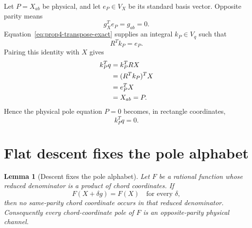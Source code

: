 \documentclass[11pt]{article}
\newtheorem{lemma}[theorem]{Lemma}
\theoremstyle{definition}
\begin{document}
Let \(P=X_{ab}\) be physical, and let \(e_P\in V_X\) be its standard basis vector.  Opposite parity means
\[
g_X^Te_P=g_{ab}=0.
\]
Equation~\eqref{eq:prop4-transpose-exact} supplies an integral \(k_P\in V_q\) such that
\begin{equation}
R^Tk_P=e_P.
\label{eq:kpreimage}
\end{equation}
Pairing this identity with \(X\) gives
\begin{align}
k_P^Tq
&=k_P^TRX\notag\\
&=(R^Tk_P)^TX\notag\\
&=e_P^TX\notag\\
&=X_{ab}=P.
\label{eq:pole-rectangle-rep}
\end{align}
Hence the physical pole equation \(P=0\) becomes, in rectangle coordinates,
\begin{equation}
k_P^Tq=0.
\label{eq:pole-qeq}
\end{equation}

\section{Flat descent fixes the pole alphabet}

\begin{lemma}[Descent fixes the pole alphabet]
Let $F$ be a rational function whose reduced denominator is a product of chord coordinates.  If
\[
F(X+\delta g)=F(X)
\quad\text{for every }\delta,
\]
then no same-parity chord coordinate occurs in that reduced denominator.  Consequently every chord-coordinate pole of $F$ is an opposite-parity physical channel.
\end{lemma}
\end{document}
